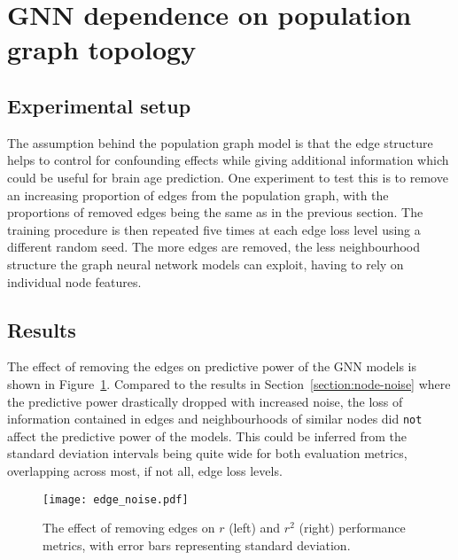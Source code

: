 \section{GNN dependence on population graph topology}
\subsection{Experimental setup}
The assumption behind the population graph model is that the edge structure helps to control for confounding effects while giving additional information which could be useful for brain age prediction. One experiment to test this is to remove an increasing proportion of edges from the population graph, with the proportions of removed edges being the same as in the previous section. The training procedure is then repeated five times at each edge loss level using a different random seed. The more edges are removed, the less neighbourhood structure the graph neural network models can exploit, having to rely on individual node features. 

\subsection{Results}
The effect of removing the edges on predictive power of the GNN models is shown in Figure~\ref{figure:edge-noise}. Compared to the results in Section~\ref{section:node-noise} where the predictive power drastically dropped with increased noise, the loss of information contained in edges and neighbourhoods of similar nodes did \texttt{not} affect the predictive power of the models. This could be inferred from the standard deviation intervals being quite wide for both evaluation metrics, overlapping across most, if not all, edge loss levels.



\begin{figure}[h]
    \centering
    \texttt{[image: edge\_noise.pdf]}
    \caption{The effect of removing edges on $r$ (left) and $r^2$ (right) performance metrics, with error bars representing standard deviation.}\label{figure:edge-noise}
\end{figure}


